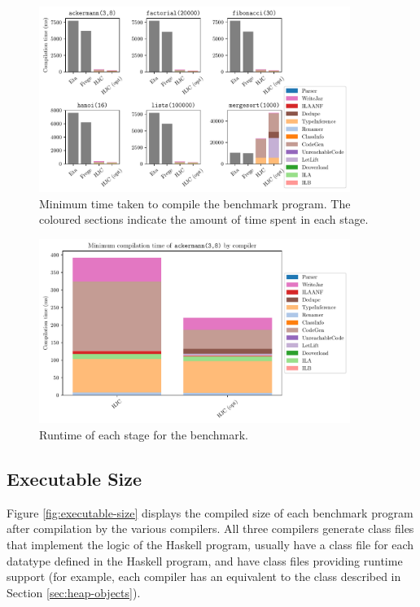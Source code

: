 \documentclass[dissertation.tex]{subfiles}
\begin{document}
{{        \begin{minipage}[t]{0.9\textwidth}
        \begin{figure}[H]
            \centering
            \captionsetup{width=0.8\textwidth}
            \includegraphics[width=0.9\textwidth]{graphs/compiler_perf.pdf}
            \caption{Minimum time taken to compile the benchmark program. The coloured sections indicate the amount of time spent in each stage.}
            \label{fig:compiler-perf}
        \end{figure}
        \begin{figure}[H]
            \centering
            \captionsetup{width=0.8\textwidth}
            \includegraphics[width=0.9\textwidth]{graphs/compiler_perf_mine_ackermann.pdf}
            \caption{Runtime of each stage for the  benchmark.}
            \label{fig:compiler-perf-ackermann}
        \end{figure}
        \end{minipage}
    }
    \subsection{Executable Size}
    {
        Figure \ref{fig:executable-size} displays the compiled size of each benchmark program after compilation by the various compilers. All three compilers generate class files that implement the logic of the Haskell program, usually have a class file for each datatype defined in the Haskell program, and have class files providing runtime support (for example, each compiler has an equivalent to the  class described in Section \ref{sec:heap-objects}).

}}
\end{document}
